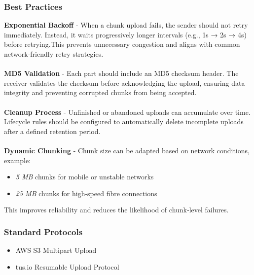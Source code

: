 \documentclass[11pt,a4paper]{article}
\begin{document}
	\subsubsection{Best Practices}
	\textbf{Exponential Backoff} - When a chunk upload fails, the sender should not retry immediately. Instead, it waits progressively longer intervals (e.g., 1s → 2s → 4s) before retrying.This prevents unnecessary congestion and aligns with common network‑friendly retry strategies.\\	
	\\
	\textbf{MD5 Validation} - Each part should include an MD5 checksum header. The receiver validates the checksum before acknowledging the upload, ensuring data integrity and preventing corrupted chunks from being accepted.\\
	\\
	\textbf{Cleanup Process} - Unfinished or abandoned uploads can accumulate over time. Lifecycle rules should be configured to automatically delete incomplete uploads after a defined retention period.\\
	\\
	\textbf{Dynamic Chunking} - Chunk size can be adapted based on network conditions, example:  
	\begin{itemize}
		\item \textit{5 MB} chunks for mobile or unstable networks  
		\item \textit{25 MB} chunks for high‑speed fibre connections  
	\end{itemize}
	This improves reliability and reduces the likelihood of chunk‑level failures.
	
	\subsubsection{Standard Protocols}
	
	\begin{itemize}
		\item AWS S3 Multipart Upload
		\item tus.io Resumable Upload Protocol
	\end{itemize}
	
	
	\label{sec:background}
\end{document}
